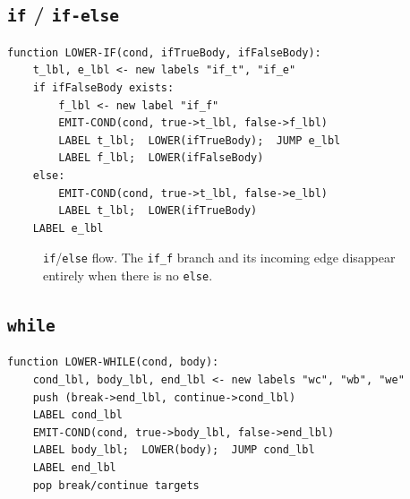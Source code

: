 \documentclass[11pt,a4paper]{article}
\begin{document}
\subsection*{\texttt{if} / \texttt{if-else}}
\begin{lstlisting}[style=pseudostyle, caption={\texttt{visit\_If}, ir\_gen.py:724--735}]
function LOWER-IF(cond, ifTrueBody, ifFalseBody):
    t_lbl, e_lbl <- new labels "if_t", "if_e"
    if ifFalseBody exists:
        f_lbl <- new label "if_f"
        EMIT-COND(cond, true->t_lbl, false->f_lbl)
        LABEL t_lbl;  LOWER(ifTrueBody);  JUMP e_lbl
        LABEL f_lbl;  LOWER(ifFalseBody)
    else:
        EMIT-COND(cond, true->t_lbl, false->e_lbl)
        LABEL t_lbl;  LOWER(ifTrueBody)
    LABEL e_lbl
\end{lstlisting}

\begin{figure}[h]
\centering
{}
\caption{\texttt{if}/\texttt{else} flow. The \texttt{if\_f} branch and its incoming edge
disappear entirely when there is no \texttt{else}.}
\end{figure}

\subsection*{\texttt{while}}
\begin{lstlisting}[style=pseudostyle, caption={\texttt{visit\_While}, ir\_gen.py:737--746}]
function LOWER-WHILE(cond, body):
    cond_lbl, body_lbl, end_lbl <- new labels "wc", "wb", "we"
    push (break->end_lbl, continue->cond_lbl)
    LABEL cond_lbl
    EMIT-COND(cond, true->body_lbl, false->end_lbl)
    LABEL body_lbl;  LOWER(body);  JUMP cond_lbl
    LABEL end_lbl
    pop break/continue targets
\end{lstlisting}
\end{document}
